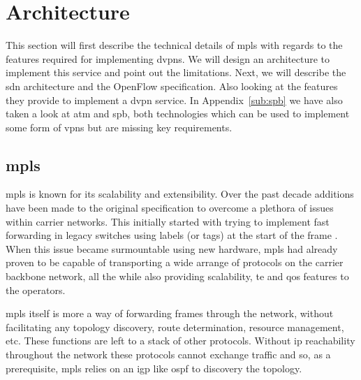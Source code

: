 \section{Architecture} %
\label{sec:implementation}

% 
% 
% 

This section will first describe the technical details of \ac{mpls} with regards to the features required for implementing \acp{dvpn}. We will design an architecture to implement this service and point out the limitations. 
Next, we will describe the \ac{sdn} architecture and the OpenFlow specification. Also looking at the features they provide to implement a \ac{dvpn} service.
In Appendix~\ref{sub:spb} we have also taken a look at \ac{atm} and \ac{spb}, both technologies which can be used to implement some form of \acp{vpn} but are missing key requirements.

\subsection{\acs{mpls}} %
\label{sub:mpls}

\ac{mpls} is known for its scalability and extensibility. Over the past decade additions have been made to the original specification to overcome a plethora of issues within carrier networks. This initially started with trying to implement fast forwarding in legacy switches using labels (or tags) at the start of the frame \cite{tag-switching}. When this issue became surmountable using new hardware, \ac{mpls} had already proven to be capable of transporting a wide arrange of protocols on the carrier backbone network, all the while also providing scalability, \ac{te} and \ac{qos} features to the operators.

\ac{mpls} itself is more a way of forwarding frames through the network, without facilitating any topology discovery, route determination, resource management, etc. These functions are left to a stack of other protocols. Without \ac{ip} reachability throughout the network these protocols cannot exchange traffic and so, as a prerequisite, \ac{mpls} relies on an \ac{igp} like \ac{ospf} to discovery the topology.

